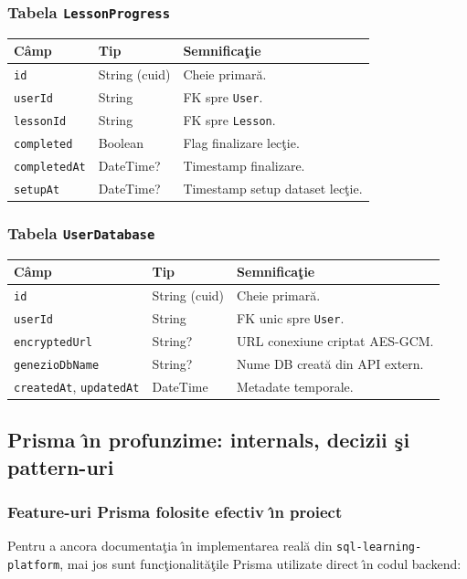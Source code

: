\documentclass[12pt,onecolumn,draftclsnofoot]{IEEEtran}
\begin{document}
\subsubsection{Tabela \texttt{LessonProgress}}
\begin{longtable}{p{} p{} p{}}
\toprule
\textbf{C\^{a}mp} & \textbf{Tip} & \textbf{Semnifica\c{t}ie} \\
\midrule
\texttt{id} & String (cuid) & Cheie primar\u{a}. \\
\texttt{userId} & String & FK spre \texttt{User}. \\
\texttt{lessonId} & String & FK spre \texttt{Lesson}. \\
\texttt{completed} & Boolean & Flag finalizare lec\c{t}ie. \\
\texttt{completedAt} & DateTime? & Timestamp finalizare. \\
\texttt{setupAt} & DateTime? & Timestamp setup dataset lec\c{t}ie. \\
\bottomrule
\end{longtable}

\newpage
\subsubsection{Tabela \texttt{UserDatabase}}
\begin{longtable}{p{} p{} p{}}
\toprule
\textbf{C\^{a}mp} & \textbf{Tip} & \textbf{Semnifica\c{t}ie} \\
\midrule
\texttt{id} & String (cuid) & Cheie primar\u{a}. \\
\texttt{userId} & String & FK unic spre \texttt{User}. \\
\texttt{encryptedUrl} & String? & URL conexiune criptat AES-GCM. \\
\texttt{genezioDbName} & String? & Nume DB creat\u{a} din API extern. \\
\texttt{createdAt}, \texttt{updatedAt} & DateTime & Metadate temporale. \\
\bottomrule
\end{longtable}

\subsection{Prisma \^{\i}n profunzime: internals, decizii \c{s}i pattern-uri}
\subsubsection{Feature-uri Prisma folosite efectiv \^{\i}n proiect}
Pentru a ancora documenta\c{t}ia \^{\i}n implementarea real\u{a} din \texttt{sql-learning-platform}, mai jos sunt func\c{t}ionalit\u{a}\c{t}ile Prisma utilizate direct \^{\i}n codul backend:
\end{document}
